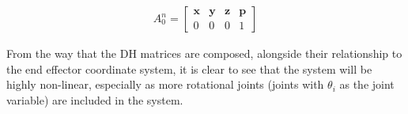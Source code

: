 \documentclass{article}
\begin{document}
    \begin{align*}
        A_{0}^{n} =
        \begin{bmatrix}
            \textbf{x} & \textbf{y} & \textbf{z} & \textbf{p} \\
            0          & 0          & 0          & 1
        \end{bmatrix}
    \end{align*}
    
    From the way that the DH matrices are composed, alongside their relationship to the end
    effector coordinate system, it is clear to see that the system will be highly non-linear,
    especially as more rotational joints (joints with $\theta_{i}$ as the joint variable) are
    included in the system.
\end{document}
